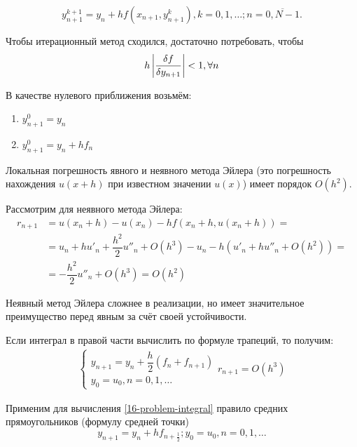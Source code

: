 \begin{equation}
  y_{n + 1}^{k + 1} = y_n + hf(x_{n + 1}, y_{n + 1}^k), k = 0, 1, \ldots;
  n = \overline{0, N - 1}.
\end{equation}

Чтобы итерационный метод сходился, достаточно потребовать, чтобы
\begin{equation}
  h\left\lvert \dfrac{\delta f}{\delta y_{n + 1}} \right\rvert < 1, \forall n
\end{equation}

В качестве нулевого приближения возьмём:
\begin{enumerate}
  \item $y_{n + 1}^0 = y_n$
  \item $y_{n + 1}^0 = y_n + hf_n$
\end{enumerate}

Локальная погрешность явного и неявного метода Эйлера (это погрешность
нахождения $u(x + h)$ при известном значении $u(x)$) имеет порядок $O(h^2)$.

Рассмотрим для неявного метода Эйлера:
\begin{equation}
  \begin{split}
    r_{n + 1} &= u(x_n + h) - u(x_n) - hf(x_{n} + h, u(x_n + h)) =\\
    &=u_n + hu'_n + \dfrac{h^2}{2}u''_n + O(h^3) - u_n - h(u'_n + hu''_n + O(h^2))=\\
    &= -\dfrac{h^2}{2}u''_n + O(h^3) = O(h^2)
  \end{split}
\end{equation}

Неявный метод Эйлера сложнее в реализации, но имеет значительное преимущество
перед явным за счёт своей устойчивости.

Если интеграл в правой части вычислить по формуле трапеций, то получим:
\begin{equation}
  \begin{split}
    \begin{cases}
      y_{n + 1} = y_n + \dfrac{h}{2}(f_n + f_{n + 1})\\
      y_0 = u_0, n = 0, 1, \ldots
    \end{cases}
    r_{n + 1} = O(h^3)
  \end{split}
\end{equation}

Применим для вычисления \eqref{16-problem-integral} правило средних
прямоугольников (формулу средней точки)
\begin{equation}
  \label{16-med-point}
  y_{n + 1} = y_n + hf_{n + \frac{1}{2}}; y_0 = u_0, n = 0, 1, \ldots
\end{equation}

